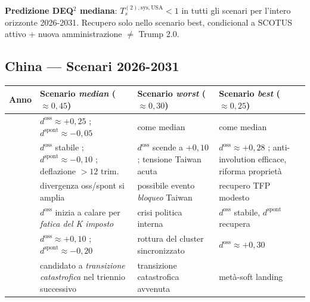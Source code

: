 \Conj{} \textbf{Predizione DEQ$^2$ mediana}:
\(T_s^{(2),\text{sys},\text{USA}} < 1\) in tutti gli scenari per
l'intero orizzonte 2026-2031. Recupero solo nello scenario best,
condicional a SCOTUS attivo + nuova amministrazione \(\neq\) Trump 2.0.

\subsection{China --- Scenari 2026-2031}\label{cina-scenari-2026-2031}

{\def\LTcaptype{none} %
{\small\begin{longtable}[]{@{}
  >{\raggedright\arraybackslash}p{}
  >{\raggedright\arraybackslash}p{}
  >{\raggedright\arraybackslash}p{}
  >{\raggedright\arraybackslash}p{}@{}}
\toprule\noalign{}
\begin{minipage}[b]{\linewidth}\raggedright
Anno
\end{minipage} & \begin{minipage}[b]{\linewidth}\raggedright
Scenario \emph{median} (\(\approx 0{,}45\))
\end{minipage} & \begin{minipage}[b]{\linewidth}\raggedright
Scenario \emph{worst} (\(\approx 0{,}30\))
\end{minipage} & \begin{minipage}[b]{\linewidth}\raggedright
Scenario \emph{best} (\(\approx 0{,}25\))
\end{minipage} \\
\midrule\noalign{}
\endhead
\bottomrule\noalign{}
\endlastfoot
2026 & \(d^{\text{oss}} \approx +0{,}25\) ;
\(d^{\text{spont}} \approx -0{,}05\) & come median & come median \\
2027 & \(d^{\text{oss}}\) stabile ; \(d^{\text{spont}} \approx -0{,}10\)
; deflazione \(> 12\) trim. & \(d^{\text{oss}}\) scende a \(+0{,}10\) ;
tensione Taiwan acuta & \(d^{\text{oss}} \approx +0{,}28\) ;
anti-involution efficace, riforma proprietà \\
2028 & divergenza oss/spont si amplia & possibile evento \emph{bloqueo}
Taiwan & recupero TFP modesto \\
2029 & \(d^{\text{oss}}\) inizia a calare per \emph{fatica del K
imposto} & crisi politica interna & \(d^{\text{oss}}\) stabile,
\(d^{\text{spont}}\) recupera \\
2030 & \(d^{\text{oss}} \approx +0{,}10\) ;
\(d^{\text{spont}} \approx -0{,}20\) & rottura del cluster sincronizzato
& \(d^{\text{oss}} \approx +0{,}30\) \\
2031 & candidato a \emph{transizione catastrofica} nel triennio
successivo & transizione catastrofica avvenuta & metà-soft landing \\
\end{longtable}}
}

